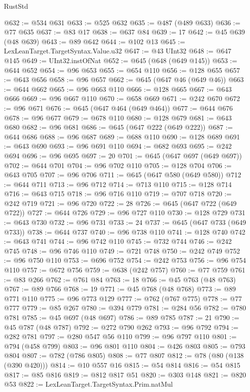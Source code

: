 \begin{lexlean}{RustStd}
\begin{coremodule}
{\begin{coremodule}
{{{{{{{{{{{{{{{{{{{{{{{{{{{{{{{{{{{{{{{{{{{{{{{{{{{{{{{{{{{{@632 := @534 @631
@633 := @525 @632
@635 := @487 (@489 @633)
@636 := @77 @635
@637 := @83 @17
@638 := @637 @84
@639 := 17
@642 := @45 @639 (@48 @639)
@643 := @89 @642
@644 := @102 @13
@645 := LexLeanTarget.TargetSyntax.Value.u32
@647 := @43 UInt32
@648 := @647 @145
@649 := UInt32.instOfNat
@652 := @645 (@648 (@649 @145))
@653 := @644 @652
@654 := @96 @653
@655 := @654 @110
@656 := @128 @655
@657 := @643 @656
@658 := @96 @657
@662 := @645 (@647 @46 (@649 @46))
@663 := @644 @662
@665 := @96 @663 @110
@666 := @128 @665
@667 := @643 @666
@669 := @96 @667 @110
@670 := @658 @669
@671 := @242 @670
@672 := @96 @671
@676 := @645 (@647 @464 (@649 @464))
@677 := @644 @676
@678 := @96 @677
@679 := @678 @110
@680 := @128 @679
@681 := @643 @680
@682 := @96 @681
@686 := @645 (@647 @222 (@649 @222))
@687 := @644 @686
@688 := @96 @687
@689 := @688 @110
@690 := @128 @689
@691 := @643 @690
@693 := @96 @691 @110
@694 := @682 @693
@695 := @242 @694
@696 := @96 @695
@697 := 20
@701 := @645 (@647 @697 (@649 @697))
@702 := @644 @701
@704 := @96 @702 @110
@705 := @128 @704
@706 := @643 @705
@707 := @96 @706
@711 := @645 (@647 @580 (@649 @580))
@712 := @644 @711
@713 := @96 @712
@714 := @713 @110
@715 := @128 @714
@716 := @643 @715
@718 := @96 @716 @110
@719 := @707 @718
@720 := @242 @719
@721 := @96 @720
@722 := 28
@726 := @645 (@647 @722 (@649 @722))
@727 := @644 @726
@729 := @96 @727 @110
@730 := @128 @729
@731 := @643 @730
@732 := @96 @731
@733 := 24
@737 := @645 (@647 @733 (@649 @733))
@738 := @644 @737
@740 := @96 @738 @110
@741 := @128 @740
@742 := @643 @741
@744 := @96 @742 @110
@745 := @732 @744
@746 := @242 @745
@748 := @96 @746 @110
@749 := @721 @748
@750 := @242 @749
@752 := @96 @750 @110
@753 := @696 @752
@754 := @242 @753
@756 := @96 @754 @110
@757 := @672 @756
@759 := @638 (@242 @757)
@760 := @77 @759
@761 := @83 @266
@762 := @761 @84
@763 := 18
@766 := @45 @763 (@48 @763)
@767 := @89 @766
@768 := 19
@771 := @45 @768 (@48 @768)
@773 := @89 @771 @110
@775 := @96 @773 @129
@777 := @762 (@767 @775)
@778 := @77 @777
@779 := @85 @267
@780 := @394 @779
@781 := @284 @56
@782 := @780 @781
@785 := @45 @697 (@48 @697)
@786 := @89 @785
@787 := 21
@790 := @45 @787 (@48 @787)
@792 := @272 @790 @262
@793 := @96 @792
@794 := @282 @781
@797 := @280 @547 @56 @110
@799 := @96 @797 @110
@801 := @794 (@458 @799)
@803 := @96 @801 @110
@804 := @426 @803
@805 := @793 @804
@807 := @782 (@786 @805)
@808 := @77 @807
@812 := @78 (@80 (@138 (@390 @420)))
@814 := @10 @557 @16
@815 := @54 @814
@816 := @54 @815
@817 := @85 @816
@819 := @812 @817 @51
@820 := @303 @148
@821 := @820 @53
@822 := LexLeanTarget.TargetSyntax.Prim.natMul
}}}}}}}}}}}}}}}}}}}}}}}}}}}}}}}}}}}}}}}}}}}}}}}}}}}}}}}}}}}}
\end{coremodule}}
\end{coremodule}
\end{lexlean}

